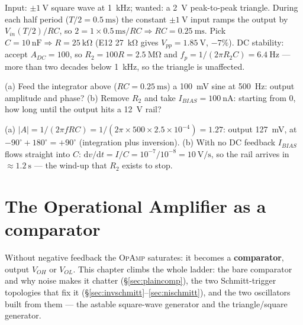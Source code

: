 \documentclass[11pt,a4paper,oneside]{book}
\newcommand{\op}{\textsc{OpAmp}}
\begin{document}
\begin{wexample}
Input: $\pm\qty{1}{\volt}$ square wave at \qty{1}{\kilo\hertz}; wanted: a
\qty{2}{\volt} peak-to-peak triangle. During each half period
($T/2=\qty{0.5}{\milli\second}$) the constant $\pm\qty{1}{\volt}$ input ramps
the output by $V_{in}(T/2)/RC$, so
$2=1\times0.5\,\text{ms}/RC\Rightarrow RC=\qty{0.25}{\milli\second}$. Pick
$C=\qty{10}{\nano\farad}\Rightarrow R=\qty{25}{\kilo\ohm}$ (E12
\qty{27}{\kilo\ohm} gives $V_{pp}=\qty{1.85}{\volt}$, $-7\%$). DC stability:
accept $A_{DC}=100$, so $R_2=100R=\qty{2.5}{\mega\ohm}$ and
$f_p=1/(2\pi R_2C)=\qty{6.4}{\hertz}$ --- more than two decades below
\qty{1}{\kilo\hertz}, so the triangle is unaffected.
\end{wexample}

\begin{exercise}
(a) Feed the integrator above ($RC=\qty{0.25}{\milli\second}$) a
\qty{100}{\milli\volt} sine at \qty{500}{\hertz}: output amplitude and phase?
(b) Remove $R_2$ and take $I_{BIAS}=\qty{100}{\nano\ampere}$: starting from
$0$, how long until the output hits a \qty{12}{\volt} rail?
\end{exercise}
\begin{solution}
(a) $|A|=1/(2\pi fRC)=1/(2\pi\times500\times2.5\times10^{-4})=1.27$: output
\qty{127}{\milli\volt}, at $-90^\circ+180^\circ=+90^\circ$ (integration plus
inversion). (b) With no DC feedback $I_{BIAS}$ flows straight into $C$:
$\mathrm{d}v/\mathrm{d}t=I/C=10^{-7}/10^{-8}=\qty{10}{\volt\per\second}$, so the
rail arrives in $\approx\qty{1.2}{\second}$ --- the wind-up that $R_2$ exists to
stop.
\end{solution}

\chapter{The Operational Amplifier as a comparator}\label{ch:comp}

Without negative feedback the \op{} saturates: it becomes a \textbf{comparator},
output $V_{OH}$ or $V_{OL}$. This chapter climbs the whole ladder: the bare
comparator and why noise makes it chatter (\S\ref{sec:plaincomp}), the two
Schmitt-trigger topologies that fix it
(\S\ref{sec:invschmitt}--\ref{sec:nischmitt}), and the two oscillators built
from them --- the astable square-wave generator and the triangle/square
generator.
\end{document}
